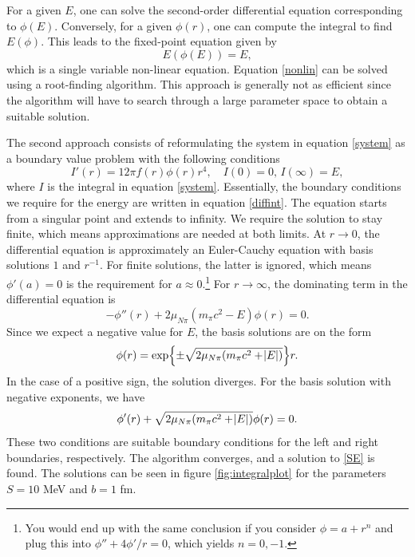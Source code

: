 For a given $E$, one can solve the second-order differential equation corresponding to $\phi(E)$. Conversely, for a given $\phi(r)$, one can compute the integral to find $E(\phi)$. This leads to the fixed-point equation given by
\begin{equation} \label{nonlin}
	E(\phi(E)) = E,
\end{equation}
which is a single variable non-linear equation. Equation \eqref{nonlin} can be solved using a root-finding algorithm. This approach is generally not as efficient since the algorithm will have to search through a large parameter space to obtain a suitable solution.

The second approach consists of reformulating the system in equation \eqref{system} as a boundary value problem with the following conditions
\begin{equation}\label{diffint}
	I'(r) = 12\pi f(r)\phi(r)r^4, \quad I(0)=0, \, I(\infty)=E,
\end{equation}
where $I$ is the integral in equation \eqref{system}. Essentially, the boundary conditions we require for the energy are written in equation \eqref{diffint}. The equation starts from a singular point and extends to infinity. We require the solution to stay finite, which means approximations are needed at both limits. At $r\rightarrow 0$, the differential equation is approximately an Euler-Cauchy equation with basis solutions $1$ and $r^{-1}$. For finite solutions, the latter is ignored, which means $\phi'(a)=0$ is the requirement for $a\approx 0$.\footnote{You would end up with the same conclusion if you consider $\phi=a+r^n$ and plug this into $\phi''+4\phi'/r=0$, which yields $n=0,-1$.} For $r\rightarrow \infty$, the dominating term in the differential equation is
\begin{equation}
	-\phi''(r)+2\mu_{N\pi}(m_\pi c^2-E)\phi(r)=0.
\end{equation}
Since we expect a negative value for $E$, the basis solutions are on the form
\begin{equation}
	\phi(r)=\exp{\pm\sqrt{2\mu_{N\pi}(m_\pi c^2+\abs{E})}}r.
\end{equation}
In the case of a positive sign, the solution diverges. For the basis solution with negative exponents, we have
\begin{equation}
	\phi'(r)+\sqrt{2\mu_{N\pi}(m_\pi c^2 +\abs{E})}\phi(r)=0.
\end{equation}
These two conditions are suitable boundary conditions for the left and right boundaries, respectively. The algorithm \cite{Scipy, SolveBVP} converges, and a solution to \eqref{SE} is found. The solutions can be seen in figure \ref{fig:integralplot} for the parameters $S=10$ MeV and $b=1$ fm.
